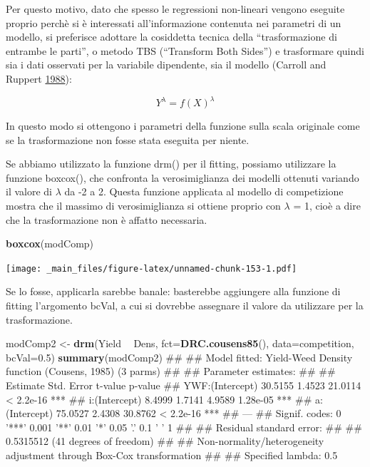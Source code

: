 \documentclass[a4paper,12pt,oneside]{book}
\newenvironment{Shaded}{\begin{snugshade}}{\end{snugshade}}
\newcommand{\KeywordTok}[1]{\textcolor[rgb]{0.13,0.29,0.53}{\textbf{#1}}}
\newcommand{\DataTypeTok}[1]{\textcolor[rgb]{0.13,0.29,0.53}{#1}}
\newcommand{\FloatTok}[1]{\textcolor[rgb]{0.00,0.00,0.81}{#1}}
\newcommand{\StringTok}[1]{\textcolor[rgb]{0.31,0.60,0.02}{#1}}
\newcommand{\OperatorTok}[1]{\textcolor[rgb]{0.81,0.36,0.00}{\textbf{#1}}}
\newcommand{\NormalTok}[1]{#1}
\theoremstyle{definition}
\theoremstyle{definition}
\theoremstyle{definition}
\theoremstyle{remark}
\begin{document}
Per questo motivo, dato che spesso le regressioni non-lineari vengono
eseguite proprio perchè si è interessati all'informazione contenuta nei
parametri di un modello, si preferisce adottare la cosiddetta tecnica
della ``trasformazione di entrambe le parti'', o metodo TBS (``Transform
Both Sides'') e trasformare quindi sia i dati osservati per la variabile
dipendente, sia il modello (Carroll and Ruppert
\protect\hyperlink{ref-carroll1988_Transformationweightingregression}{1988}):

\[Y^\lambda  = f(X)^\lambda\]

In questo modo si ottengono i parametri della funzione sulla scala
originale come se la trasformazione non fosse stata eseguita per niente.

Se abbiamo utilizzato la funzione drm() per il fitting, possiamo
utilizzare la funzione boxcox(), che confronta la verosimiglianza dei
modelli ottenuti variando il valore di \(\lambda\) da -2 a 2. Questa
funzione applicata al modello di competizione mostra che il massimo di
verosimiglianza si ottiene proprio con \(\lambda\) = 1, cioè a dire che
la trasformazione non è affatto necessaria.

\begin{Shaded}
\begin{Highlighting}[]
\KeywordTok{boxcox}\NormalTok{(modComp)}
\end{Highlighting}
\end{Shaded}

\texttt{[image: \_main\_files/figure-latex/unnamed-chunk-153-1.pdf]}

Se lo fosse, applicarla sarebbe banale: basterebbe aggiungere alla
funzione di fitting l'argomento bcVal, a cui si dovrebbe assegnare il
valore da utilizzare per la trasformazione.

\begin{Shaded}
\begin{Highlighting}[]
\NormalTok{modComp2 <-}\StringTok{ }\KeywordTok{drm}\NormalTok{(Yield }\OperatorTok{~}\StringTok{ }\NormalTok{Dens, }\DataTypeTok{fct=}\KeywordTok{DRC.cousens85}\NormalTok{(), }\DataTypeTok{data=}\NormalTok{competition,}
               \DataTypeTok{bcVal=}\FloatTok{0.5}\NormalTok{)}
\KeywordTok{summary}\NormalTok{(modComp2)}
\NormalTok{## }
\NormalTok{## Model fitted: Yield-Weed Density function (Cousens, 1985) (3 parms)}
\NormalTok{## }
\NormalTok{## Parameter estimates:}
\NormalTok{## }
\NormalTok{##                 Estimate Std. Error t-value   p-value    }
\NormalTok{## YWF:(Intercept)  30.5155     1.4523 21.0114 < 2.2e-16 ***}
\NormalTok{## i:(Intercept)     8.4999     1.7141  4.9589  1.28e-05 ***}
\NormalTok{## a:(Intercept)    75.0527     2.4308 30.8762 < 2.2e-16 ***}
\NormalTok{## ---}
\NormalTok{## Signif. codes:  0 '***' 0.001 '**' 0.01 '*' 0.05 '.' 0.1 ' ' 1}
\NormalTok{## }
\NormalTok{## Residual standard error:}
\NormalTok{## }
\NormalTok{##  0.5315512 (41 degrees of freedom)}
\NormalTok{## }
\NormalTok{## Non-normality/heterogeneity adjustment through Box-Cox transformation}
\NormalTok{## }
\NormalTok{## Specified lambda: 0.5}
\end{Highlighting}
\end{Shaded}
\end{document}
